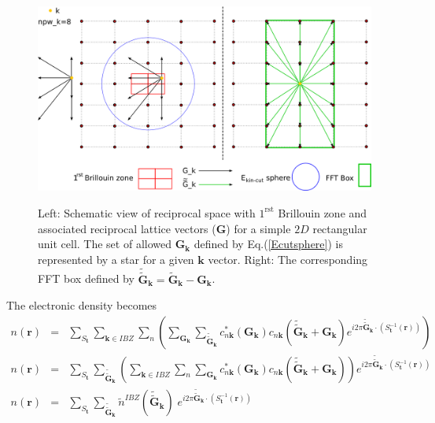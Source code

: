 \documentclass[a4paper,12pt]{report}
\begin{document}
\begin{figure}[!ht]
\centering
\begin{minipage}[c]{1.0\textwidth}
\includegraphics[width = \textwidth]{FFTbox}
\end{minipage}
\vspace{0.27\textwidth}
\begin{minipage}[c]{0.8\textwidth}
\caption{\small Left: Schematic view of reciprocal space with $1^{\text{rst}}$ Brillouin zone and associated reciprocal lattice vectors ($\mathbf{G}$) for a simple $2D$ rectangular unit cell. The set of allowed $\mathbf{G}_{\mathbf{k}}$ defined by Eq.(\ref{Ecutsphere}) is represented by a star for a given $\mathbf{k}$ vector. Right: The corresponding FFT box defined by $\tilde{\tilde{\mathbf{G}}}_{\mathbf{k}} = \tilde{\mathbf{G}}_{\mathbf{k}} -\mathbf{G}_{\mathbf{k}}$.}
\vspace*{1.0ex}
\label{fig_FFTbox}
\end{minipage}
\end{figure}

The electronic density becomes
\begin{eqnarray}
n(\mathbf{r}) &=& \sum_{S_{\mathbf{t}}} \sum_{\mathbf{k} \in IBZ} \sum_n \left( \sum_{\mathbf{G}_{\mathbf{k}}} \sum_{\tilde{\tilde{\mathbf{G}}}_{\mathbf{k}}} c_{n\mathbf{k}}^{*}(\mathbf{G}_{\mathbf{k}}) c_{n\mathbf{k}}(\tilde{\tilde{\mathbf{G}}}_{\mathbf{k}}+\mathbf{G}_{\mathbf{k}}) e^{i2\pi \tilde{\tilde{\mathbf{G}}}_{\mathbf{k}} \cdotp \left( S_{\mathbf{t}}^{-1} (\mathbf{r})\right) } \right) \nonumber \\
n(\mathbf{r}) &=& \sum_{S_{\mathbf{t}}} \sum_{\tilde{\tilde{\mathbf{G}}}_{\mathbf{k}}} \left( \sum_{\mathbf{k} \in IBZ} \sum_n \sum_{\mathbf{G}_{\mathbf{k}}}  c_{n\mathbf{k}}^{*}(\mathbf{G}_{\mathbf{k}}) c_{n\mathbf{k}}(\tilde{\tilde{\mathbf{G}}}_{\mathbf{k}}+\mathbf{G}_{\mathbf{k}})\right) e^{i2\pi \tilde{\tilde{\mathbf{G}}}_{\mathbf{k}} \cdotp \left( S_{\mathbf{t}}^{-1} (\mathbf{r})\right) }  \nonumber \\
n(\mathbf{r}) &=& \sum_{S_{\mathbf{t}}} \sum_{\tilde{\tilde{\mathbf{G}}}_{\mathbf{k}}} \tilde{n}^{IBZ}(\tilde{\tilde{\mathbf{G}}}_{\mathbf{k}})\; e^{i2\pi \tilde{\tilde{\mathbf{G}}}_{\mathbf{k}} \cdotp \left( S_{\mathbf{t}}^{-1} (\mathbf{r})\right) }
\end{eqnarray}
\end{document}
